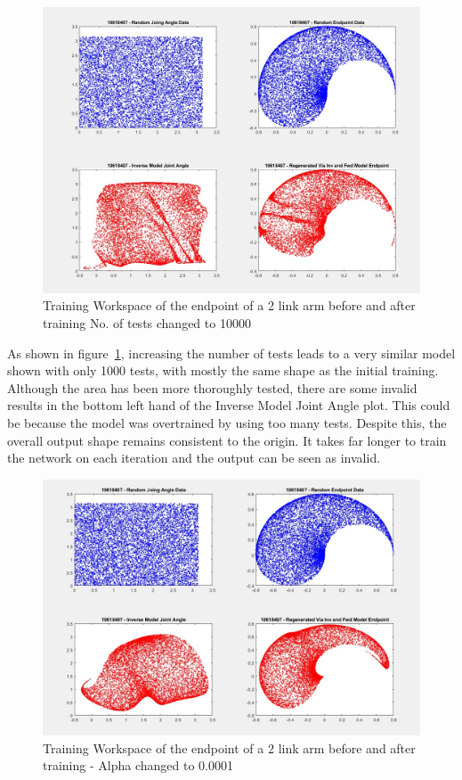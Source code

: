 \documentclass [11pt]{article}
\begin{document}
\begin{figure}[H]
\centerline{\includegraphics[width=15cm]{training_workspace_of_the_endpoint-of_a_2-link_arm_10000_tests}}
\caption{Training Workspace of the endpoint of a 2 link arm before and after training No. of tests changed to 10000}
\label{fig:test_1000_to_10000}
\end{figure}

As shown in figure~\ref{fig:test_1000_to_10000}, increasing the number of tests leads to a very similar model shown with only 1000 tests, with mostly the same shape as the initial training. Although the area has been more thoroughly tested, there are some invalid results in the bottom left hand of the Inverse Model Joint Angle plot. This could be because the model was overtrained by using too many tests. Despite this, the overall output shape remains consistent to the origin. It takes far longer to train the network on each iteration and the output can be seen as invalid. 

\begin{figure}[H]
\centerline{\includegraphics[width=15cm]{training_workspace_of_the_endpoint-of_a_2-link_arm_alpha_0001}}
\caption{Training Workspace of the endpoint of a 2 link arm before and after training - Alpha changed to 0.0001}
\label{fig:alpha_0.0001}
\end{figure}
\end{document}
